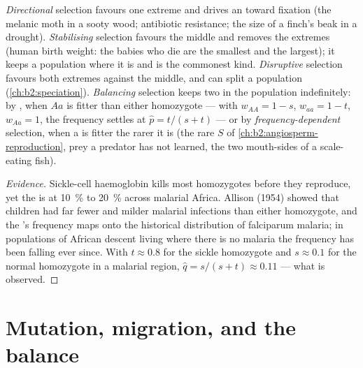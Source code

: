 \begin{proposition}\label{prop:b2:population-genetics:kinds}
\emph{Directional} selection favours one extreme and drives an
 toward fixation (the melanic moth in a sooty wood; antibiotic
resistance; the size of a finch's beak in a drought).
\emph{Stabilising} selection favours the middle and removes the
extremes (human birth weight: the babies who die are the smallest
and the largest); it keeps a population where it is and is the
commonest kind. \emph{Disruptive} selection favours both extremes
against the middle, and can split a population
(\cref{ch:b2:speciation}). \emph{Balancing} selection keeps two
 in the population indefinitely: by \emph{}, when $Aa$ is fitter than either homozygote --- with
$w_{AA} = 1 - s$, $w_{aa} = 1 - t$, $w_{Aa} = 1$, the frequency
settles at $\hat p = t/(s + t)$ --- or by \emph{frequency-dependent}
selection, when a  is fitter the rarer it is (the rare
$S$  of \cref{ch:b2:angiosperm-reproduction}, prey a
predator has not learned, the two mouth-sides of a scale-eating
fish).
\end{proposition}
\begin{proof}[Evidence]
Sickle-cell haemoglobin kills most homozygotes before they
reproduce, yet the  is at \qty{10}{\%} to \qty{20}{\%} across
malarial Africa. Allison (1954) showed that  children
had far fewer and milder malarial infections than either
homozygote, and the 's frequency maps onto the historical
distribution of falciparum malaria; in populations of African
descent living where there is no malaria the frequency has been
falling ever since. With $t \approx 0.8$ for the sickle homozygote
and $s \approx 0.1$ for the normal homozygote in a malarial region,
$\hat q = s/(s + t) \approx 0.11$ --- what is observed.
\end{proof}

\section{Mutation, migration, and the balance}

